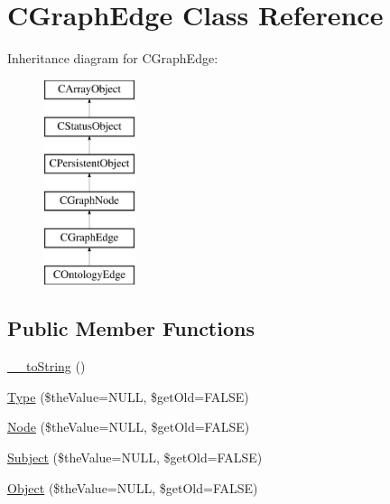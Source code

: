 \hypertarget{class_c_graph_edge}{\section{C\-Graph\-Edge Class Reference}
\label{class_c_graph_edge}
}
Inheritance diagram for C\-Graph\-Edge\-:\begin{figure}[H]
\begin{center}
\leavevmode
\includegraphics[height=6.000000cm]{class_c_graph_edge}
\end{center}
\end{figure}
\subsection*{Public Member Functions}
\begin{DoxyCompactItemize}
\item 
\hyperlink{class_c_graph_edge_a8329f594ad1ca48e5f1ccb04e02fdffb}{\-\_\-\-\_\-to\-String} ()
\item 
\hyperlink{class_c_graph_edge_a584c0263fd773ffb764385a51d36caf2}{Type} (\$the\-Value=N\-U\-L\-L, \$get\-Old=F\-A\-L\-S\-E)
\item 
\hyperlink{class_c_graph_edge_a6606e13ba79ab94fc0db50bef197d416}{Node} (\$the\-Value=N\-U\-L\-L, \$get\-Old=F\-A\-L\-S\-E)
\item 
\hyperlink{class_c_graph_edge_a85669389df602d0ed4f936824756f715}{Subject} (\$the\-Value=N\-U\-L\-L, \$get\-Old=F\-A\-L\-S\-E)
\item 
\hyperlink{class_c_graph_edge_a6714cb916eaf902979eb84590b337cf9}{Object} (\$the\-Value=N\-U\-L\-L, \$get\-Old=F\-A\-L\-S\-E)
\end{DoxyCompactItemize}
